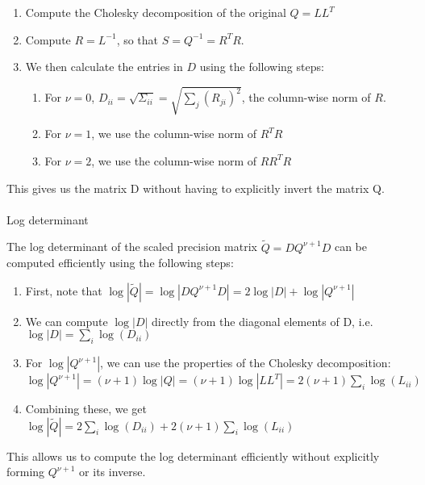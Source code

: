 \documentclass[journal=,manuscript=]{achemso}
\makeatletter
\let\oldparagraph\paragraph
\renewcommand{\paragraph}{
    \@ifstar
      \xxxParagraphStar
      \xxxParagraphNoStar
  }
\newcommand{\xxxParagraphStar}[1]{\oldparagraph*{#1}\mbox{}}
\newcommand{\xxxParagraphNoStar}[1]{\oldparagraph{#1}\mbox{}}
\providecommand{\tightlist}{%
  \setlength{\itemsep}{0pt}\setlength{\parskip}{0pt}}\usepackage{longtable,booktabs,array}
\makeatother
\begin{document}
\begin{enumerate}
\def\labelenumi{\arabic{enumi}.}
\tightlist
\item
  Compute the Cholesky decomposition of the original \(Q = LL^T\)
\item
  Compute \(R = L^{-1}\), so that \(S = Q^{-1} = R^TR\).
\item
  We then calculate the entries in \(D\) using the following steps:

  \begin{enumerate}
  \def\labelenumii{\roman{enumii}.}
  \tightlist
  \item
    For \(\nu = 0\),
    \(D_{ii} = \sqrt{\Sigma_{ii}} = \sqrt{\sum_j (R_{ji})^2}\), the
    column-wise norm of \(R\).
  \item
    For \(\nu = 1\), we use the column-wise norm of \(R^TR\)
  \item
    For \(\nu = 2\), we use the column-wise norm of \(RR^TR\)
  \end{enumerate}
\end{enumerate}

This gives us the matrix D without having to explicitly invert the
matrix Q.

\paragraph{Log determinant}\label{log-determinant}

The log determinant of the scaled precision matrix
\(\tilde{Q} = DQ^{\nu+1}D\) can be computed efficiently using the
following steps:

\begin{enumerate}
\def\labelenumi{\arabic{enumi}.}
\tightlist
\item
  First, note that
  \(\log|\tilde{Q}| = \log|DQ^{\nu+1}D| = 2\log|D| + \log|Q^{\nu+1}|\)
\item
  We can compute \(\log|D|\) directly from the diagonal elements of D,
  i.e.~\(\log|D| = \sum_i \log(D_{ii})\)
\item
  For \(\log|Q^{\nu+1}|\), we can use the properties of the Cholesky
  decomposition:
  \(\log|Q^{\nu+1}| = (\nu+1)\log|Q| = (\nu+1)\log|LL^T| = 2(\nu+1)\sum_i \log(L_{ii})\)
\item
  Combining these, we get
  \(\log|\tilde{Q}| = 2\sum_i \log(D_{ii}) + 2(\nu+1)\sum_i \log(L_{ii})\)
\end{enumerate}

This allows us to compute the log determinant efficiently without
explicitly forming \(Q^{\nu+1}\) or its inverse.
\end{document}
